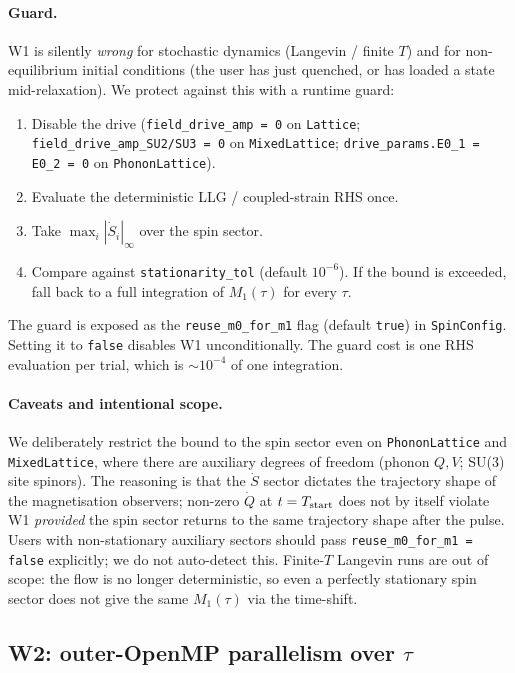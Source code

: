 \documentclass[11pt,letterpaper]{article}
\begin{document}
\paragraph{Guard.}  W1 is silently \emph{wrong} for stochastic
dynamics (Langevin / finite $T$) and for non-equilibrium initial
conditions (the user has just quenched, or has loaded a state
mid-relaxation).  We protect against this with a runtime guard:
\begin{enumerate}[noitemsep]
  \item Disable the drive (\texttt{field\_drive\_amp = 0} on
        \texttt{Lattice}; \texttt{field\_drive\_amp\_SU2/SU3 = 0}
        on \texttt{MixedLattice}; \texttt{drive\_params.E0\_1 =
        E0\_2 = 0} on \texttt{PhononLattice}).
  \item Evaluate the deterministic LLG / coupled-strain RHS once.
  \item Take $\max_i |\dot S_i|_\infty$ over the spin sector.
  \item Compare against \texttt{stationarity\_tol} (default
        $10^{-6}$).  If the bound is exceeded, fall back to a
        full integration of $M_1(\tau)$ for every $\tau$.
\end{enumerate}
The guard is exposed as the \texttt{reuse\_m0\_for\_m1} flag (default
\texttt{true}) in \texttt{SpinConfig}.  Setting it to \texttt{false}
disables W1 unconditionally.  The guard cost is one RHS evaluation
per trial, which is $\sim 10^{-4}$ of one integration.

\paragraph{Caveats and intentional scope.}  We deliberately
restrict the bound to the spin sector even on
\texttt{PhononLattice} and \texttt{MixedLattice}, where there are
auxiliary degrees of freedom (phonon $Q,V$; SU(3) site spinors).
The reasoning is that the $\dot S$ sector dictates the trajectory
shape of the magnetisation observers; non-zero $\dot Q$ at $t = T_{\rm
start}$ does not by itself violate W1 \emph{provided} the spin
sector returns to the same trajectory shape after the pulse.
Users with non-stationary auxiliary sectors should pass
\texttt{reuse\_m0\_for\_m1 = false} explicitly; we do not
auto-detect this.  Finite-$T$ Langevin runs are out of scope: the
flow is no longer deterministic, so even a perfectly stationary
spin sector does not give the same $M_1(\tau)$ via the time-shift.

\subsection{W2: outer-OpenMP parallelism over $\tau$}
\label{sec:w2}
\end{document}
